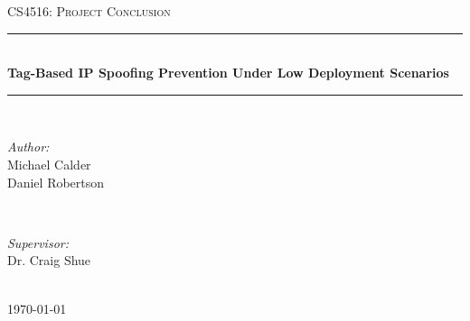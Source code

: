 \documentclass[12pt]{article} %
\begin{document}

\begin{titlepage}

\newcommand{\HRule}{\rule{\linewidth}{0.5mm}} %

\center %

\textsc{\LARGE CS4516: Project Conclusion}\\[1.5cm] %

\HRule \\[0.4cm]
{ \huge \bfseries Tag-Based IP Spoofing Prevention Under Low Deployment Scenarios}\\[0.4cm] %
\HRule \\[1.5cm]

\begin{minipage}{0.4\textwidth}
\begin{flushleft} \large
\emph{Author:}\\
Michael Calder\\
Daniel Robertson\\
\end{flushleft}
\end{minipage}
~
\begin{minipage}{0.4\textwidth}
\begin{flushright} \large
\emph{Supervisor:} \\
Dr. Craig Shue %
\end{flushright}
\end{minipage}\\[4cm]

{\large \today}\\[3cm] %


\vfill %

\end{titlepage}

\end{document}
